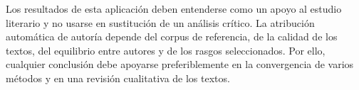 \documentclass[IB]{TFUOC}%
\begin{document}
Los resultados de esta aplicación deben entenderse como un apoyo al estudio literario y no usarse en sustitución de un análisis crítico. La atribución automática de autoría depende del corpus de referencia, de la calidad de los textos, del equilibrio entre autores y de los rasgos seleccionados. Por ello, cualquier conclusión debe apoyarse preferiblemente en la convergencia de varios métodos y en una revisión cualitativa de los textos.



\end{document}
